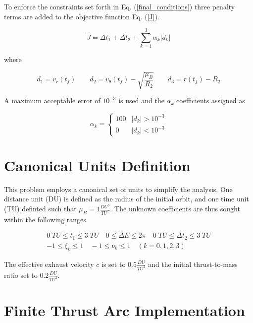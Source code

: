 \noindent To enforce the constraints set forth in Eq. (\ref{final_conditions}) three penalty terms are added to the objective function Eq. (\ref{J}).

\begin{equation}
\tilde{J} = \Delta t_1 + \Delta t_2 + \sum_{k=1}^3 \alpha_k|d_k| 
\label{JwithPenalty}
\end{equation}

\noindent where 

\begin{equation}
d_1 = v_r(t_f) \quad \quad d_2 = v_\theta(t_f) - \sqrt{\dfrac{\mu_B}{R_2}} \quad \quad 
d_3 = r(t_f)-R_2
\label{penaltyValues}
\end{equation}

\noindent A maximum acceptable error of $10^{-3}$ is used and the $\alpha_k$ coefficients assigned as  

\begin{equation}
    \label{penaltyCoefficients}
\alpha_k = \begin{cases}
    100 & |d_k| > 10^{-3} \\
    0 & |d_k| < 10^{-3}
\end{cases}
\end{equation}


\section{Canonical Units Definition}

\noindent This problem employs a canonical set of units to simplify the analysis. One distance unit (DU) is defined as the radius of the initial orbit,
and one time unit (TU) definted such that $\mu_B = 1 \frac{DU^3}{TU^2}$. The unknown coefficients are thus sought within the following ranges

\begin{equation}
\label{particleBounds}
\begin{gathered}
0 \; TU \leq t_1 \leq 3 \; TU \quad 0 \leq \Delta E \leq 2\pi \quad 0 \; TU \leq \Delta t_2 \leq 3 \; TU \\
-1 \leq \xi_k \leq 1 \quad -1 \leq \nu_k \leq 1 \quad (k = 0,1,2,3)
\end{gathered}
\end{equation}

\noindent The effective exhaust velocity $c$ is set to $0.5 \frac{DU}{TU^2}$ and the initial thrust-to-mass ratio set to $0.2 \frac{DU}{TU^2}$. 


\section{Finite Thrust Arc Implementation}

